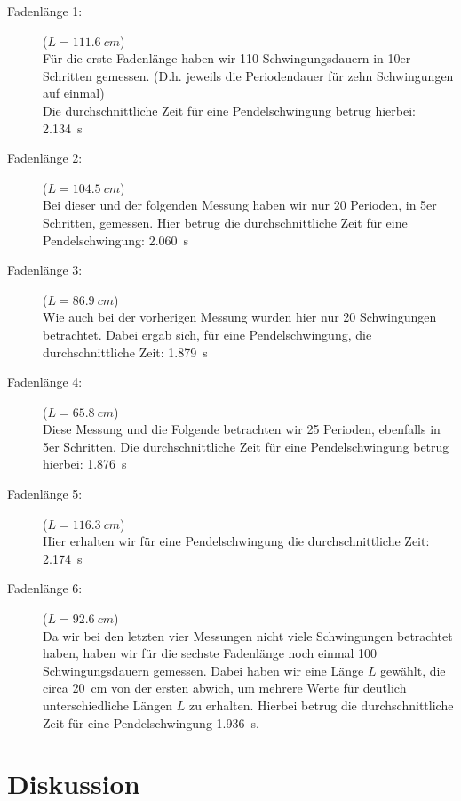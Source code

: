 \documentclass[11pt,a4paper,titlepage, ngerman]{article}
\begin{document}
			\begin{description}
				
				\item[Fadenlänge 1:]($L = \SI{111,6}{cm}$)\\
				Für die erste Fadenlänge haben wir 110 Schwingungsdauern in 10er Schritten gemessen. (D.h. jeweils die Periodendauer für zehn Schwingungen auf einmal) \\
				Die durchschnittliche Zeit für eine Pendelschwingung betrug hierbei: \SI{2.134}{s}
				
				\item[Fadenlänge 2:]($L = \SI{104,5}{cm}$)\\ 				 
				Bei dieser und der folgenden Messung haben wir nur 20 Perioden, in 5er Schritten, gemessen. Hier betrug die durchschnittliche Zeit für eine Pendelschwingung: \SI{2,060}{s}
				
				\item[Fadenlänge 3:]($L = \SI{86,9}{cm}$)\\ 			
				Wie auch bei der vorherigen Messung wurden hier nur 20 Schwingungen betrachtet. Dabei ergab sich, für eine Pendelschwingung, die durchschnittliche Zeit: \SI{1,879}{s}		
				
				\item[Fadenlänge 4:]($L = \SI{65,8}{cm}$)\\ 				
				Diese Messung und die Folgende betrachten wir 25 Perioden, ebenfalls in 5er Schritten. Die durchschnittliche Zeit für eine Pendelschwingung betrug hierbei: \SI{1,876}{s}
				
				\item[Fadenlänge 5:]($L = \SI{116,3}{cm}$)\\ 				
				Hier erhalten wir für eine Pendelschwingung die durchschnittliche Zeit: \SI{2,174}{s}
				
				\item[Fadenlänge 6:]($L = \SI{92,6}{cm}$)\\ 				
				Da wir bei den letzten vier Messungen nicht viele Schwingungen betrachtet haben, haben wir für die sechste Fadenlänge noch einmal 100 Schwingungsdauern gemessen. Dabei haben wir eine Länge $L$ gewählt, die circa \SI{20}{cm} von der ersten abwich, um mehrere Werte für \glqq deutlich\grqq{} unterschiedliche Längen $L$ zu erhalten. 
				Hierbei betrug die durchschnittliche Zeit für eine Pendelschwingung \SI{1,936}{s}.
				
			\end{description}
		
	\section{Diskussion}	
		\label{Diskussion}		
		
\end{document}
